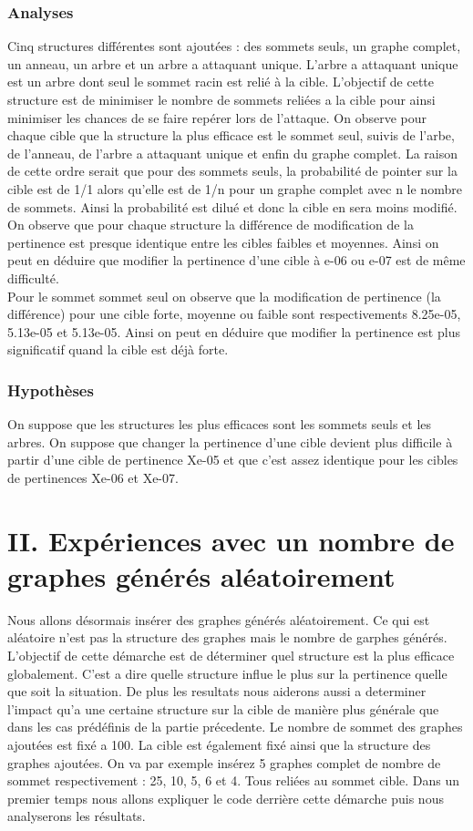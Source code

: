 \documentclass[a4paper,11pt]{article}
\begin{document}
		\subsubsection{Analyses}
			Cinq structures différentes sont ajoutées : des sommets seuls, un graphe complet, un anneau, un arbre et un arbre a attaquant unique. L'arbre a attaquant unique est un arbre dont seul le sommet racin est relié 
			à la cible. L'objectif de cette structure est de minimiser le nombre de sommets reliées a la cible pour ainsi minimiser les chances de se faire repérer lors de l'attaque.
			On observe pour chaque cible que la structure la plus efficace est le sommet seul, suivis de l'arbe, de l'anneau, de l'arbre a attaquant unique et enfin du graphe complet.
			La raison de cette ordre serait que pour des sommets seuls, la probabilité de pointer sur la cible est de 1/1 alors qu'elle est de 1/n pour un graphe complet
			avec n le nombre de sommets. Ainsi la probabilité est dilué et donc la cible en sera moins modifié.\\
			On observe que pour chaque structure la différence de modification de la pertinence est presque identique entre les cibles faibles et moyennes.
			Ainsi on peut en déduire que modifier la pertinence d'une cible à e-06 ou e-07 est de même difficulté.\\		
			Pour le sommet sommet seul on observe que la modification de pertinence (la différence) pour une cible forte, moyenne ou faible sont respectivements
			8.25e-05, 5.13e-05 et 5.13e-05. Ainsi on peut en déduire que modifier la pertinence est plus significatif quand la cible est déjà forte.
			
		\subsubsection{Hypothèses}
			On suppose que les structures les plus efficaces sont les sommets seuls et les arbres. On suppose que changer la pertinence d'une cible devient 
			plus difficile à partir d'une cible de pertinence Xe-05 et que c'est assez identique pour les cibles de pertinences Xe-06 et Xe-07.

\section{II.	Expériences avec un nombre de graphes générés aléatoirement}
	Nous allons désormais insérer des graphes générés aléatoirement. Ce qui est aléatoire n'est pas la structure des graphes mais le nombre de garphes générés.
	L'objectif de cette démarche est de déterminer quel structure est la plus efficace globalement.
	C'est a dire quelle structure influe le plus sur la pertinence quelle que soit la situation.
	De plus les resultats nous aiderons aussi a determiner l'impact qu'a une certaine structure sur la cible de manière plus générale 
	que dans les cas prédéfinis de la partie précedente.
	Le nombre de sommet des graphes ajoutées est fixé a 100.
	La cible est également fixé ainsi que la structure des graphes ajoutées.
	On va par exemple insérez 5 graphes complet de nombre de sommet respectivement : 25, 10, 5, 6 et 4. Tous reliées au sommet cible.
	Dans un premier temps nous allons expliquer le code derrière cette démarche puis nous analyserons les résultats.
\end{document}
